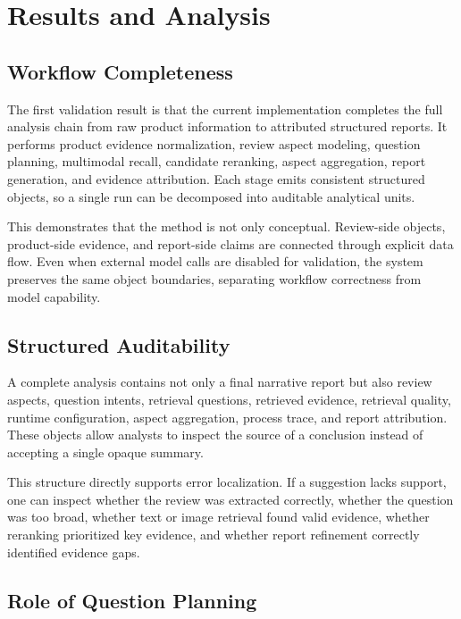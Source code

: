 \documentclass[11pt]{article}
\begin{document}
\section{Results and Analysis}
\subsection{Workflow Completeness}

The first validation result is that the current implementation completes the full analysis chain from raw product information to attributed structured reports. It performs product evidence normalization, review aspect modeling, question planning, multimodal recall, candidate reranking, aspect aggregation, report generation, and evidence attribution. Each stage emits consistent structured objects, so a single run can be decomposed into auditable analytical units.

This demonstrates that the method is not only conceptual. Review-side objects, product-side evidence, and report-side claims are connected through explicit data flow. Even when external model calls are disabled for validation, the system preserves the same object boundaries, separating workflow correctness from model capability.

\subsection{Structured Auditability}

A complete analysis contains not only a final narrative report but also review aspects, question intents, retrieval questions, retrieved evidence, retrieval quality, runtime configuration, aspect aggregation, process trace, and report attribution. These objects allow analysts to inspect the source of a conclusion instead of accepting a single opaque summary.

This structure directly supports error localization. If a suggestion lacks support, one can inspect whether the review was extracted correctly, whether the question was too broad, whether text or image retrieval found valid evidence, whether reranking prioritized key evidence, and whether report refinement correctly identified evidence gaps.

\subsection{Role of Question Planning}
\end{document}
